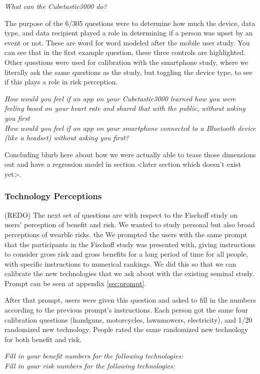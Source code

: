 \documentclass{acm_proc_article-sp}
\begin{document}
\textit{What can the Cubetastic3000 do?} 


The purpose of the 6/305 questions were to determine how much the device, data type, and data recipient played a role in determining if a person was upset by an event or not. These are word for word modeled after the mobile user study. You can see that in the first example question, these three controls are highlighted. Other questions were used for calibration with the smartphone study, where we literally ask the same questions as the study, but toggling the device type, to see if this plays a role in risk perception.

\textit{How would you feel if an app on your Cubetastic3000 learned how you were feeling based on your heart rate and shared that with the public, without asking you first}\\[-.5cm]

\textit{How would you feel if an app on your smartphone connected to a Bluetooth device (like a headset) without asking you first?} 

Concluding blurb here about how we were actually able to tease those dimensions out and have a regression model in section <later section which doesn't exist yet>.  

\subsubsection{Technology Perceptions}
(REDO) The next set of questions are with respect to the Fischoff study on users’ perception of benefit and risk. We wanted to study personal but also broad perceptions of wearble risks. the We prompted the users with the same prompt that the participants in the Fischoff study was presented with, giving instructions to consider gross risk and gross benefits for a long period of time for all people, with specific instructions to numerical rankings. We did this so that we can calibrate the new technologies that we ask about with the existing seminal study. Prompt can be seen at appendix \ref{sec:prompt}. 

After that prompt, users were given this question and asked to fill in the numbers according to the previous prompt’s instructions. Each person got the same four calibration questions (handguns, motorcycles, lawnmowers, electricity), and 1/20 randomized new technology.  People rated the same randomized new technology for both benefit and risk.

\textit{Fill in your benefit numbers for the following technologies:}\\
\textit{Fill in your risk numbers for the following technologies:}
\end{document}
